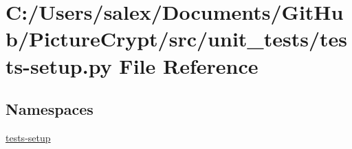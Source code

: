\hypertarget{tests-setup_8py}{}\section{C\+:/\+Users/salex/\+Documents/\+Git\+Hub/\+Picture\+Crypt/src/unit\+\_\+tests/tests-\/setup.py File Reference}
\label{tests-setup_8py}
\subsection*{Namespaces}
\begin{DoxyCompactItemize}
\item 
 \mbox{\hyperlink{namespacetests-setup}{tests-\/setup}}
\end{DoxyCompactItemize}
